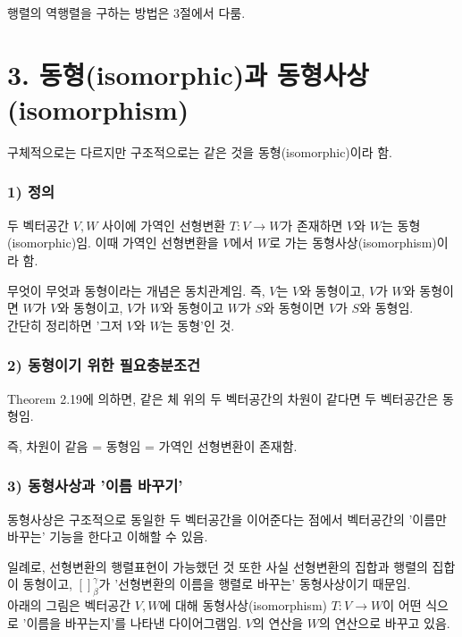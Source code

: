 \documentclass[10pt, a4paper]{article}
\begin{document}
행렬의 역행렬을 구하는 방법은 3절에서 다룸.


\newpage


\section*{3. 동형(isomorphic)과 동형사상(isomorphism)}
구체적으로는 다르지만 구조적으로는 같은 것을 동형(isomorphic)이라 함.

\subsubsection*{1) 정의}
두 벡터공간 $V,W$ 사이에 가역인 선형변환 $T:V \rightarrow W$가 존재하면 $V$와 $W$는 동형(isomorphic)임. 이때 가역인 선형변환을 $V$에서 $W$로 가는 동형사상(isomorphism)이라 함.

무엇이 무엇과 동형이라는 개념은 동치관계임. 즉, $V$는 $V$와 동형이고, $V$가 $W$와 동형이면 $W$가 $V$와 동형이고, $V$가 $W$와 동형이고 $W$가 $S$와 동형이면 $V$가 $S$와 동형임.\\
간단히 정리하면 '그저 $V$와 $W$는 동형'인 것.

\subsubsection*{2) 동형이기 위한 필요충분조건}
Theorem 2.19에 의하면, 같은 체 위의 두 벡터공간의 차원이 같다면 두 벡터공간은 동형임.

즉, 차원이 같음 = 동형임 = 가역인 선형변환이 존재함.

\subsubsection*{3) 동형사상과 '이름 바꾸기'}
동형사상은 구조적으로 동일한 두 벡터공간을 이어준다는 점에서 벡터공간의 '이름만 바꾸는' 기능을 한다고 이해할 수 있음.

일례로, 선형변환의 행렬표현이 가능했던 것 또한 사실 선형변환의 집합과 행렬의 집합이 동형이고, $[]_{\beta}^{\gamma}$가 '선형변환의 이름을 행렬로 바꾸는' 동형사상이기 때문임.\\

아래의 그림은 벡터공간 $V,W$에 대해 동형사상(isomorphism) $T:V \rightarrow W$이 어떤 식으로 '이름을 바꾸는지'를 나타낸 다이어그램임. $V$의 연산을 $W$의 연산으로 바꾸고 있음.

\end{document}
